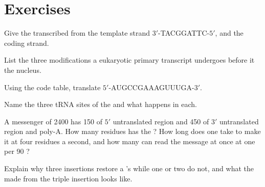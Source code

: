 \section{Exercises}

\begin{exercise}[$\star$]\label{exo:b1:gene-expression:1}
Give the  transcribed from the template strand
$3'$-TACGGATTC-$5'$, and the coding strand.
\end{exercise}

\begin{exercise}[$\star$]\label{exo:b1:gene-expression:2}
List the three modifications a eukaryotic primary transcript
undergoes before it  the nucleus.
\end{exercise}

\begin{exercise}[$\star$]\label{exo:b1:gene-expression:3}
Using the code table, translate $5'$-AUGCCGAAAGUUUGA-$3'$.
\end{exercise}

\begin{exercise}[$\star$]\label{exo:b1:gene-expression:4}
Name the three tRNA sites of the  and what happens in each.
\end{exercise}

\begin{exercise}[$\star\star$]\label{exo:b1:gene-expression:5}
A messenger of \qty{2400}{}  has \qty{150}{} of $5'$
untranslated region and \qty{450}{} of $3'$ untranslated region and
poly-A. How many residues has the ? How long does one 
take to make it at four residues a second, and how many 
can read the message at once at one per \qty{90}{} ?
\end{exercise}

\begin{exercise}[$\star\star$]\label{exo:b1:gene-expression:6}
Explain why three insertions restore a 's  while one
or two do not, and what the  made from the triple insertion
looks like.
\end{exercise}

